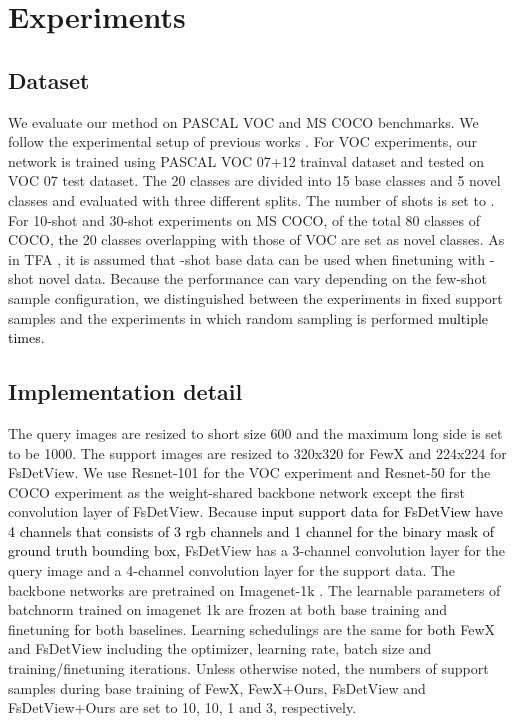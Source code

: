 \documentclass[10pt,twocolumn,letterpaper]{article}
\newcommand{\nj}[1]{\textcolor{black}{#1}}
\begin{document}
\section{Experiments}
\label{sec:experiments}

\subsection{Dataset}
\label{subsec:data}
We evaluate our method on PASCAL VOC \cite{pascal-voc-2007, pascal-voc-2012} and MS COCO \cite{lin2015microsoft} benchmarks. We follow the experimental setup of previous works \cite{yan2019meta,kang2019few, wang2020frustratingly, xiao2020few}. For VOC experiments, our network is trained using PASCAL VOC 07+12 trainval dataset and tested on VOC 07 test dataset. The 20 classes are divided into 15 base classes and 5 novel classes and evaluated with three different splits. The number of shots is set to . For 10-shot and 30-shot experiments on MS COCO, of the total 80 classes of COCO, \nj{the} 20 classes overlapping with those of VOC are set as novel classes. As in TFA \cite{wang2020frustratingly}, it is assumed that -shot base data can be used when finetuning with -shot novel data. Because the performance can vary depending on the few-shot sample configuration, we distinguished between the experiments in fixed support samples and the experiments in which random sampling is performed \nj{multiple times}.


\subsection{Implementation detail}
\label{subsec:imple}
The query images are resized to short size 600 and the maximum long side is set to be 1000. The support images are resized to 320x320 for FewX and 224x224 for FsDetView. We use Resnet-101 \cite{he2016deep} for the VOC experiment and Resnet-50 for the COCO experiment as the weight-shared backbone network except \nj{the} first convolution layer of FsDetView. Because \nj{input support data for FsDetView have 4 channels that consists of 3 rgb channels and 1 channel for the binary mask of ground truth bounding box,} FsDetView has a 3-channel convolution layer for the query image and a 4-channel convolution layer for the support data. The backbone networks are pretrained on Imagenet-1k \cite{ILSVRC15}. The learnable parameters of batchnorm \cite{ioffe2015batch} trained on imagenet 1k are frozen at both base training and finetuning \nj{for} both baselines. Learning schedulings are the same \nj{for both} FewX and FsDetView including the optimizer, learning rate, batch size and training/finetuning iterations. Unless otherwise noted, the numbers of support samples  during base training of FewX, FewX+Ours, FsDetView and FsDetView+Ours are set to 10, 10, 1 and 3\footnotemark, respectively.  
\end{document}
